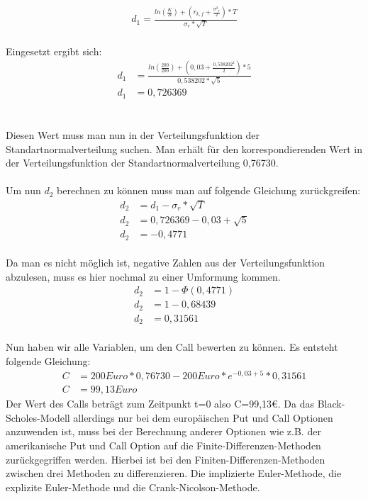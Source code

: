 \documentclass[12pt,titlepage]{article}
\begin{document}
\begin{align*}
d_1=\frac{ln(\frac{K}{B})+(r_{k,f}+\frac{\sigma{^2}_r}{2})*T}{\sigma _r *\sqrt{T}}
\end{align*}\\
Eingesetzt ergibt sich:\\
\begin{align*}
d_1&=\frac{ln(\frac{200}{200})+(0,03+\frac{0,538202^2}{2})*5}{0,538202 *\sqrt{5}}\\
d_1&=0,726369
\end{align*}\\
\\Diesen Wert muss man nun in der Verteilungsfunktion der Standartnormalverteilung suchen. Man erhält für den korrespondierenden Wert in der Verteilungsfunktion der Standartnormalverteilung 0,76730.
\\\\Um nun $d_2$ berechnen zu können muss man auf folgende Gleichung zurückgreifen:
\begin{align*}
d_2&=d_1-\sigma_r*\sqrt{T}\\
d_2&=0,726369-0,03+\sqrt{5}\\
d_2&=-0,4771
\end{align*}\\
Da man es nicht möglich ist, negative Zahlen aus der Verteilungsfunktion abzulesen, muss es hier nochmal zu einer Umformung kommen.\\
\begin{align*}
d_2&=1-\Phi (0,4771)\\
d_2&=1-0,68439    \\    
d_2&=0,31561
\end{align*}\\
Nun haben wir alle Variablen, um den Call bewerten zu können. Es entsteht folgende Gleichung:\\
\begin{align*}
C&=200Euro*0,76730-200Euro*e^{-0,03+5}*0,31561\\
C&=99,13Euro
\end{align*}
Der Wert des Calls beträgt zum Zeitpunkt t=0 also C=99,13€.
Da das Black-Scholes-Modell allerdings nur bei dem europäischen Put und Call Optionen anzuwenden ist, muss bei der Berechnung anderer Optionen wie z.B. der amerikanische Put und Call Option auf die Finite-Differenzen-Methoden zurückgegriffen werden. 
Hierbei ist bei den Finiten-Differenzen-Methoden zwischen drei Methoden zu differenzieren. Die implizierte Euler-Methode, die explizite Euler-Methode und die Crank-Nicolson-Methode.\\
\end{document}

